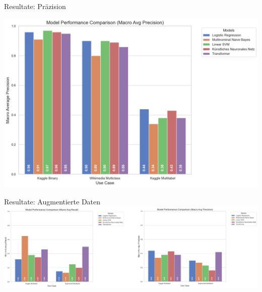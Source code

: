 \documentclass[aspectratio=169]{beamer} %
\begin{document}
\begin{frame}{Resultate: Präzision}
    \begin{center}
        \includegraphics[scale=0.35]{figures/macro_avg_precision_usecases.png}
    \end{center}
\end{frame}

\begin{frame}{Resultate: Augmentierte Daten}
    \includegraphics[scale=0.7]{figures/AugmentierteDatenVergleichZusammen.png}
\end{frame}
\end{document}
